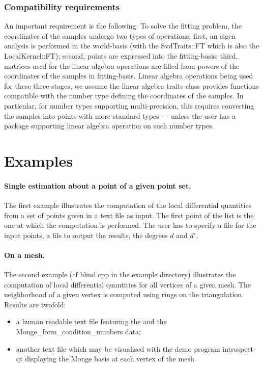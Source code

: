 \subsubsection{Compatibility requirements}

An important requirement is the following. To solve the fitting
problem, the coordinates of the samples undergo two types of
operations: first, an eigen analysis is performed in the world-basis
(with the SvdTraits::FT which is also the LocalKernel::FT); second,
points are expressed into the fitting-basis; third, matrices used for the
linear algebra operations are filled from powers of the coordinates of
the samples in fitting-basis. Linear algebra operations being used for
these three stages, we assume the linear algebra traits class provides
functions compatible with the number type defining the coordinates of
the samples. In particular, for number types supporting
multi-precision, this requires converting the samples into points with
more standard types --- unless the user has a package supporting linear
algebra operation on such number types.


\section{Examples} 

\paragraph{Single estimation about a point of a given point set.}
The first example illustrates the computation of the local
differential quantities from a set of points given in a text file as
input. The first point of the list is the one at which the computation
is performed. The user has to specify a file for the input points, a
file to output the results, the degrees $d$ and $d'$.

\paragraph{On a mesh.}
The second example (cf blind.cpp in the example directory) illustrates
the computation of local differential quantities for all vertices of a
given mesh. The neighborhood of a given vertex is computed using rings on
the triangulation. Results are twofold:
\begin{itemize}
\item
a human readable text file featuring the  and the
Monge\_form\_condition\_numbers data;
\item
another text file which may be visualised with the demo program
introspect-qt displaying the Monge basis at each vertex of the mesh.
\end{itemize}

